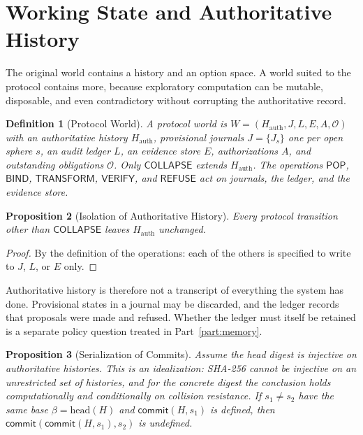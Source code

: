 \documentclass[12pt,oneside,openany]{book}
\theoremstyle{spherepop}
\newtheorem{definition}{Definition}[chapter]
\newtheorem{proposition}[definition]{Proposition}
\theoremstyle{remarkstyle}
\begin{document}
\section{Working State and Authoritative History}

The original world contains a history and an option space. A world suited to the protocol contains more, because exploratory computation can be mutable, disposable, and even contradictory without corrupting the authoritative record.

\begin{definition}[Protocol World]
A \emph{protocol world} is $W=(H_{\mathrm{auth}},J,L,E,A,\mathcal O)$ with an authoritative history $H_{\mathrm{auth}}$, provisional journals $J=\{J_s\}$ one per open sphere $s$, an audit ledger $L$, an evidence store $E$, authorizations $A$, and outstanding obligations $\mathcal O$. Only $\mathsf{COLLAPSE}$ extends $H_{\mathrm{auth}}$. The operations $\mathsf{POP}$, $\mathsf{BIND}$, $\mathsf{TRANSFORM}$, $\mathsf{VERIFY}$, and $\mathsf{REFUSE}$ act on journals, the ledger, and the evidence store.
\end{definition}

\begin{proposition}[Isolation of Authoritative History]
\label{prop:isolation}
Every protocol transition other than $\mathsf{COLLAPSE}$ leaves $H_{\mathrm{auth}}$ unchanged.
\end{proposition}

\begin{proof}
By the definition of the operations: each of the others is specified to write to $J$, $L$, or $E$ only.
\end{proof}

Authoritative history is therefore not a transcript of everything the system has done. Provisional states in a journal may be discarded, and the ledger records that proposals were made and refused. Whether the ledger must itself be retained is a separate policy question treated in Part~\ref{part:memory}.

\begin{proposition}[Serialization of Commits]
\label{prop:serial}
Assume the head digest is injective on authoritative histories. This is an idealization: SHA-256 cannot be injective on an unrestricted set of histories, and for the concrete digest the conclusion holds computationally and conditionally on collision resistance. If $s_1\ne s_2$ have the same base $\beta=\mathrm{head}(H)$ and $\mathsf{commit}(H,s_1)$ is defined, then $\mathsf{commit}(\mathsf{commit}(H,s_1),s_2)$ is undefined.
\end{proposition}
\end{document}
